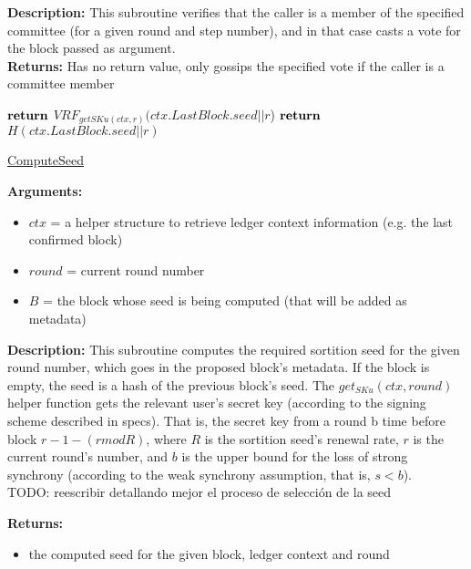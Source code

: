 \documentclass[10pt,a4paper]{article}
\begin{document}
\textbf{Description:}
This subroutine verifies that the caller is a member of the specified committee (for a given round and step number), 
and in that case casts a vote for the block passed as argument.\\

\textbf{Returns:}
Has no return value, only gossips the specified vote if the caller is a committee member


\begin{algorithm}
    \begin{algorithmic}[H]
            \State $\Return$ $VRF_{getSKu(ctx, r)}(ctx.LastBlock.seed||r$)
        \Else
            \State $\Return$ $H(ctx.LastBlock.seed||r)$
        \EndIf
    \EndFunction
    \end{algorithmic}
    \caption{\underline{ComputeSeed}}
\end{algorithm}


\textbf{Arguments:}
\begin{itemize}
    \item $ctx$ = a helper structure to retrieve ledger context information (e.g. the last confirmed block)
    \item $round$ = current round number
    \item $B$ = the block whose seed is being computed (that will be added as metadata)
  \end{itemize}


\textbf{Description:}
This subroutine computes the required sortition seed for the given round number, which goes in the proposed block's metadata.
If the block is empty, the seed is a hash of the previous block's seed.
The $get_{SKu}(ctx, round)$ helper function gets the relevant user's secret key (according to the signing scheme described in specs).
That is, the secret key from a round b time before block $r-1-(r mod R)$, where $R$ is the sortition seed's renewal rate, $r$ is the current round's number,
and $b$ is the upper bound for the loss of strong synchrony (according to the weak synchrony assumption, that is, $s < b$).\\

TODO: reescribir detallando mejor el proceso de selección de la seed

\textbf{Returns:}
\begin{itemize}
    \item the computed seed for the given block, ledger context and round
  \end{itemize}
\end{document}
